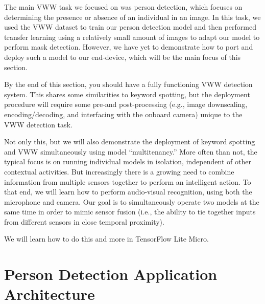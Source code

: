     The main VWW task we focused on was person detection, which focuses on determining the presence or absence of an individual in an image. In this task, we used the VWW dataset to train our person detection model and then performed transfer learning using a relatively small amount of images to adapt our model to perform mask detection. However, we have yet to demonstrate how to port and deploy such a model to our end-device, which will be the main focus of this section.
    
    By the end of this section, you should have a fully functioning VWW detection system. This shares some similarities to keyword spotting, but the deployment procedure will require some pre-and post-processing (e.g., image downscaling, encoding/decoding, and interfacing with the onboard camera) unique to the VWW detection task.
    
    Not only this, but we will also demonstrate the deployment of keyword spotting and VWW simultaneously using model “multitenancy.” More often than not, the typical focus is on running individual models in isolation, independent of other contextual activities. But increasingly there is a growing need to combine information from multiple sensors together to perform an intelligent action. To that end, we will learn how to perform audio-visual recognition, using both the microphone and camera. Our goal is to simultaneously operate two models at the same time in order to mimic sensor fusion (i.e., the ability to tie together inputs from different sensors in close temporal proximity).
    
    We will learn how to do this and more in TensorFlow Lite Micro.
    
\section{Person Detection Application Architecture}

